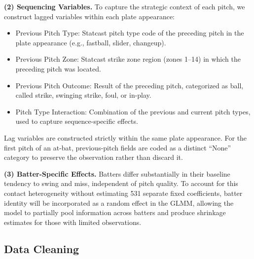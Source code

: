 \documentclass[11pt]{article}
\newcommand{\numBatters}{531}            %
\begin{document}
\medskip
\noindent\textbf{(2) Sequencing Variables.}
To capture the strategic context of each pitch, we construct lagged variables within each plate appearance:
\begin{itemize}[nosep]
    \item Previous Pitch Type: Statcast pitch type code of the preceding pitch in the plate appearance (e.g., fastball, slider, changeup).
    \item Previous Pitch Zone: Statcast strike zone region (zones 1--14) in which the preceding pitch was located.
    \item Previous Pitch Outcome: Result of the preceding pitch, categorized as ball, called strike, swinging strike, foul, or in-play.
    \item Pitch Type Interaction: Combination of the previous and current pitch types, used to capture sequence-specific effects.
\end{itemize}
Lag variables are constructed strictly within the same plate appearance.
For the first pitch of an at-bat, previous-pitch fields are coded as a distinct ``None'' category to preserve the observation rather than discard it.

\medskip
\noindent\textbf{(3) Batter-Specific Effects.}
Batters differ substantially in their baseline tendency to swing and miss, independent of pitch quality. 
To account for this contact heterogeneity without estimating \numBatters{} separate fixed coefficients, batter identity will be incorporated as a random effect in the GLMM, 
allowing the model to partially pool information across batters and produce shrinkage estimates for those with limited observations.

\subsection{Data Cleaning}
\end{document}
